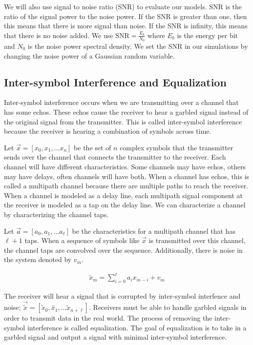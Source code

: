 We will also use signal to noise ratio (SNR) to evaluate our models.  SNR is the ratio of the signal power to the noise power.  
If the SNR is greater than one, then this means that there is more signal than noise.  If the SNR is infinity, this means that there is no noise added.
We use $\text{SNR}=\frac{E_b}{N_0}$ where $E_b$ is the energy per bit and $N_0$ is the noise power spectral density.
We set the SNR in our simulations by changing the noise power of a Gaussian random variable. 

\subsection{Inter-symbol Interference and Equalization}

Inter-symbol interference occurs when we are transmitting over a channel that has some echos.  These echos cause the receiver to hear a garbled signal instead of the original signal from the transmitter.  This is called inter-symbol interference because the receiver is hearing a combination of symbols across time. 

Let $\vec{x}=[x_0, x_1, \ldots x_n]$ be the set of $n$ complex symbols that the transmitter sends over the channel that connects the transmitter to the receiver.
Each channel will have different characteristics. Some channels may have echos, others may have delays, often channels will have both.  When a channel has echos, this is called a multipath channel because there are multiple paths to reach the receiver.  
When a channel is modeled as a delay line, each multipath signal component at the receiver is modeled as a tap on the delay line.  
We can characterize a channel by characterizing the channel taps.

Let $\vec{a} = [a_0, a_1, \ldots a_{\ell}]$ be the characteristics for a multipath channel that has $\ell+1$ taps. When a sequence of symbols like $\vec{x}$ is transmitted over this channel, the channel taps are convolved over the sequence.  Additionally, there is noise in the system denoted by $v_m$. 

\begin{align}
\tilde{x}_m = \sum_{i=0}^{\ell} a_i x_{m-i} + v_m
\end{align}

The receiver will hear a signal that is corrupted by inter-symbol interfence and noise;
$\vec{\tilde{x}}=[\tilde{x}_0, \tilde{x_1}, \ldots \tilde{x}_{n+\ell}]$. 
Receivers must be able to handle garbled signals in order to transmit data in the real world.  The process of removing the inter-symbol interference is called equalization.  The goal of equalization is to take in a garbled signal and output a signal with minimal inter-symbol interference. 

